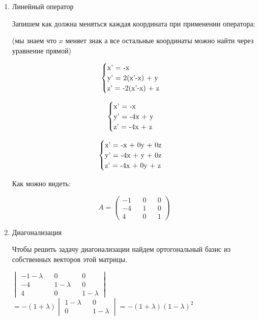\begin{enumerate}
	\item Линейный оператор
	
	Запишем как должна меняться каждая координата при применении оператора:

	(мы знаем что $x$ меняет знак а все остальные координаты можно найти через уравнение прямой)

	\begin{equation*}
		\begin{cases}
		  $x' = -x$\\
		  $y' = 2(x'-x) + y$\\
		  $z' = -2(x'-x) + z$
		\end{cases}
	   \end{equation*}

	   \begin{equation*}
		\begin{cases}
		  $x' = -x$\\
		  $y' = -4x + y$\\
		  $z' = -4x + z$
		\end{cases}
	   \end{equation*}

	   \begin{equation*}
		\begin{cases}
		  $x' = -x + 0y + 0z$\\
		  $y' = -4x + y + 0z$\\
		  $z' = -4x + 0y + z$
		\end{cases}
	   \end{equation*}

	Как можно видеть:

	   $$
	   A = 
	   \begin{pmatrix}
		-1 && 0 && 0\\
		-4 && 1 && 0\\
		4 && 0 && 1
	\end{pmatrix}
	$$

	\item Диагонализация
	
	Чтобы решить задачу диагонализации найдем ортогональный базис из собственных векторов этой матрицы.

	$
	\begin{vmatrix}
	 -1 - \lambda && 0 && 0\\
	 -4 && 1 - \lambda && 0\\
	 4 && 0 && 1 - \lambda
	\end{vmatrix}
	$
	$ = -(1+\lambda)
	\begin{vmatrix}
		1-\lambda && 0\\
		0 && 1-\lambda
	\end{vmatrix}
	= -(1+\lambda)(1-\lambda)^2
	$\\


\end{enumerate}
